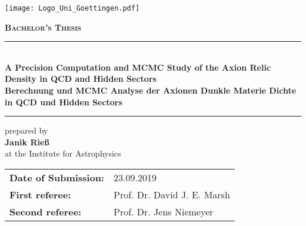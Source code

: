 \documentclass[twoside,a4paper, 12pt]{article}
\numberwithin{equation}{section}
\begin{document}
% 
% 
% 
% 
% 

\raggedbottom

\begin{titlepage}

\texttt{[image: Logo\_Uni\_Goettingen.pdf]}
\vspace*{1cm}

\centering
\textsc{\Large \bfseries Bachelor's Thesis}

\vspace*{0.5cm}

\rule{\textwidth}{1pt}\\[0.5cm]
{\Large \bfseries A Precision Computation and MCMC Study of the Axion Relic Density in QCD and Hidden Sectors \\[0.5cm]
Berechnung und MCMC Analyse der Axionen Dunkle Materie Dichte in QCD und Hidden Sectors\\[0.5cm]}

\rule{\textwidth}{1pt}

\vspace*{1cm}
{
\centering\Large
prepared by\\[0.2cm]
{\bfseries Janik Rieß}\\[0.2cm]
at the Institute for Astrophysics 
}

\vspace*{2cm}

\begin{Large}
\begin{tabular}{ll}
\bfseries Date of Submission: &23.09.2019\\
\bfseries First referee: &Prof. Dr. David J. E. Marsh\\
\bfseries Second referee: &Prof. Dr. Jens Niemeyer\\
\end{tabular}
\end{Large}

\vspace*{1.5cm}

\end{titlepage}
\end{document}
